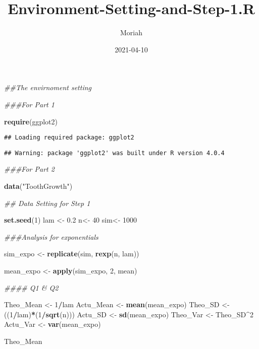 \documentclass[
]{article}
\title{Environment-Setting-and-Step-1.R}
\author{Moriah}
\date{2021-04-10}
\newenvironment{Shaded}{\begin{snugshade}}{\end{snugshade}}
\newcommand{\CommentTok}[1]{\textcolor[rgb]{0.56,0.35,0.01}{\textit{#1}}}
\newcommand{\DecValTok}[1]{\textcolor[rgb]{0.00,0.00,0.81}{#1}}
\newcommand{\FloatTok}[1]{\textcolor[rgb]{0.00,0.00,0.81}{#1}}
\newcommand{\KeywordTok}[1]{\textcolor[rgb]{0.13,0.29,0.53}{\textbf{#1}}}
\newcommand{\NormalTok}[1]{#1}
\newcommand{\OperatorTok}[1]{\textcolor[rgb]{0.81,0.36,0.00}{\textbf{#1}}}
\newcommand{\StringTok}[1]{\textcolor[rgb]{0.31,0.60,0.02}{#1}}
\begin{document}
\maketitle

\begin{Shaded}
\begin{Highlighting}[]
\CommentTok{##The envirnoment setting}

\CommentTok{###For Part 1}

\KeywordTok{require}\NormalTok{(ggplot2)}
\end{Highlighting}
\end{Shaded}

\begin{verbatim}
## Loading required package: ggplot2
\end{verbatim}

\begin{verbatim}
## Warning: package 'ggplot2' was built under R version 4.0.4
\end{verbatim}

\begin{Shaded}
\begin{Highlighting}[]
\CommentTok{###For Part 2}

\KeywordTok{data}\NormalTok{(}\StringTok{"ToothGrowth"}\NormalTok{)}

\CommentTok{## Data Setting for Step 1}

\KeywordTok{set.seed}\NormalTok{(}\DecValTok{1}\NormalTok{)}
\NormalTok{lam <-}\StringTok{ }\FloatTok{0.2}
\NormalTok{n<-}\StringTok{ }\DecValTok{40}
\NormalTok{sim<-}\StringTok{ }\DecValTok{1000}

\CommentTok{###Analysis for exponentials}

\NormalTok{sim_expo <-}\StringTok{ }\KeywordTok{replicate}\NormalTok{(sim, }\KeywordTok{rexp}\NormalTok{(n, lam))}

\NormalTok{mean_expo <-}\StringTok{ }\KeywordTok{apply}\NormalTok{(sim_expo, }\DecValTok{2}\NormalTok{, mean)}

\CommentTok{#### Q1 & Q2}

\NormalTok{Theo_Mean <-}\StringTok{ }\DecValTok{1}\OperatorTok{/}\NormalTok{lam}
\NormalTok{Actu_Mean <-}\StringTok{ }\KeywordTok{mean}\NormalTok{(mean_expo)}
\NormalTok{Theo_SD <-}\StringTok{ }\NormalTok{((}\DecValTok{1}\OperatorTok{/}\NormalTok{lam)}\OperatorTok{*}\NormalTok{(}\DecValTok{1}\OperatorTok{/}\KeywordTok{sqrt}\NormalTok{(n)))}
\NormalTok{Actu_SD <-}\StringTok{ }\KeywordTok{sd}\NormalTok{(mean_expo)}
\NormalTok{Theo_Var <-}\StringTok{ }\NormalTok{Theo_SD}\OperatorTok{^}\DecValTok{2}
\NormalTok{Actu_Var <-}\StringTok{ }\KeywordTok{var}\NormalTok{(mean_expo)}

\NormalTok{Theo_Mean}
\end{Highlighting}
\end{Shaded}
\end{document}
